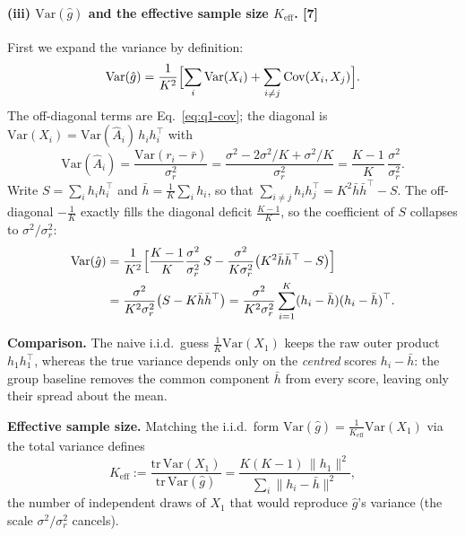 \documentclass[11pt,a4paper]{article}
\begin{document}
\paragraph{(iii) $\mathrm{Var}(\hat g)$ and the effective sample size $K_{\mathrm{eff}}$. \hfill\textnormal{[7]}}
First we expand the variance by definition:
\begin{equation}
  \mathrm{Var}(\hat g)=\frac{1}{K^2}\Bigl[\sum_{i}\mathrm{Var}(X_i)+\sum_{i\neq j}\mathrm{Cov}(X_i,X_j)\Bigr].
  \label{eq:q1-varg}
\end{equation}
The off-diagonal terms are Eq.~\eqref{eq:q1-cov}; the diagonal is
$\mathrm{Var}(X_i)=\mathrm{Var}(\hat A_i)\,h_ih_i^{\top}$ with
\begin{equation}
  \mathrm{Var}(\hat A_i)=\frac{\mathrm{Var}(r_i-\bar r)}{\sigma_r^{2}}
  =\frac{\sigma^2-2\sigma^2/K+\sigma^2/K}{\sigma_r^{2}}
  =\frac{K-1}{K}\,\frac{\sigma^2}{\sigma_r^{2}}.
  \label{eq:q1-vara}
\end{equation}
Write $S=\sum_i h_ih_i^{\top}$ and $\bar h=\tfrac1K\sum_i h_i$, so that
$\sum_{i\neq j}h_ih_j^{\top}=K^2\bar h\bar h^{\top}-S$. The off-diagonal $-\tfrac1K$ exactly
fills the diagonal deficit $\tfrac{K-1}{K}$, so the coefficient of $S$ collapses to
$\sigma^2/\sigma_r^{2}$:
\begin{align}
  \mathrm{Var}(\hat g)
    &=\frac{1}{K^2}\Bigl[\frac{K-1}{K}\frac{\sigma^2}{\sigma_r^{2}}\,S
       -\frac{\sigma^2}{K\sigma_r^{2}}\bigl(K^2\bar h\bar h^{\top}-S\bigr)\Bigr]\nonumber\\
    &=\frac{\sigma^2}{K^2\sigma_r^{2}}\bigl(S-K\bar h\bar h^{\top}\bigr)
     =\frac{\sigma^2}{K^2\sigma_r^{2}}\sum_{i=1}^{K}(h_i-\bar h)(h_i-\bar h)^{\top}.
  \label{eq:q1-varg-result}
\end{align}

\noindent\textbf{Comparison.} The naive i.i.d.\ guess $\tfrac1K\mathrm{Var}(X_1)$ keeps the raw
outer product $h_1h_1^{\top}$, whereas the true variance depends only on the \emph{centred}
scores $h_i-\bar h$: the group baseline removes the common component $\bar h$ from every score,
leaving only their spread about the mean.

\smallskip\noindent\textbf{Effective sample size.} Matching the i.i.d.\ form
$\mathrm{Var}(\hat g)=\tfrac{1}{K_{\mathrm{eff}}}\mathrm{Var}(X_1)$ via the total variance defines
\begin{equation}
  K_{\mathrm{eff}}:=\frac{\mathrm{tr}\,\mathrm{Var}(X_1)}{\mathrm{tr}\,\mathrm{Var}(\hat g)}
  =\frac{K(K-1)\,\lVert h_1\rVert^2}{\sum_{i}\lVert h_i-\bar h\rVert^2},
  \label{eq:q1-keff}
\end{equation}
the number of independent draws of $X_1$ that would reproduce $\hat g$'s variance (the scale
$\sigma^2/\sigma_r^{2}$ cancels).
\end{document}
